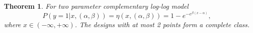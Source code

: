\documentclass[11pt]{amsart}
\newtheorem{theorem}{Theorem}[section]
\theoremstyle{definition}
\theoremstyle{remark}
\numberwithin{equation}{section}
\begin{document}


\begin{theorem}\label{comp}
For two parameter complementary log-log model\[
P(y=1|x,(\alpha,\beta)) = \eta(x,(\alpha,\beta))= 1-e^{-e^{\beta(x-\alpha)}},
\] where $x\in (-\infty,+\infty)$. The designs with at most 2 points form a complete class.
\end{theorem}
\end{document}
